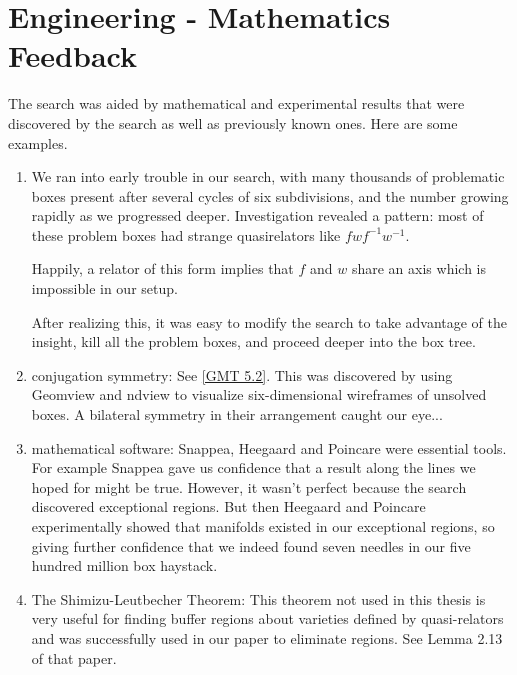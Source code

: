 \section{Engineering - Mathematics Feedback}
The search was aided
by mathematical and experimental results
that were discovered by the search
as well as previously known ones.
Here are some examples.
\begin{enumerate}
	\item 
		We ran into early trouble in our search, with many thousands
		of problematic boxes present after
		several cycles of six subdivisions, and the number growing
		rapidly as we progressed deeper.
		Investigation revealed a pattern:
		most of these problem boxes had strange quasirelators
		like $fwf^{-1}w^{-1}$.
		
		Happily, a relator of this form
		implies that $f$ and $w$ share an axis
		which is impossible in our setup.

		After realizing this, it was easy to modify the search to
		take advantage of the insight,
		kill all the problem boxes,
		and proceed deeper into the box tree.
	\item
		conjugation symmetry: See \ref{GMT 5.2}.
		This was discovered by using Geomview and ndview
		to visualize six-dimensional wireframes of unsolved boxes.
		A bilateral symmetry in their arrangement caught our eye...
		
	\item
		mathematical software:
		Snappea, Heegaard and Poincare were essential tools.
		For example Snappea gave us confidence that a result along the lines we hoped for might be true.
		However, it wasn't perfect because the search discovered exceptional regions.
		But then Heegaard and Poincare experimentally showed
		that manifolds existed in our exceptional regions,
		so giving further confidence
		that we indeed found seven needles in
		our five hundred million box haystack.

	\item
		The Shimizu-Leutbecher Theorem:
		This theorem not used in this thesis is very useful
		for finding buffer regions about varieties
		defined by quasi-relators
		and was successfully used in our paper \cite{GHMTY}
		to eliminate regions. See Lemma 2.13 of that paper.

\end{enumerate}

